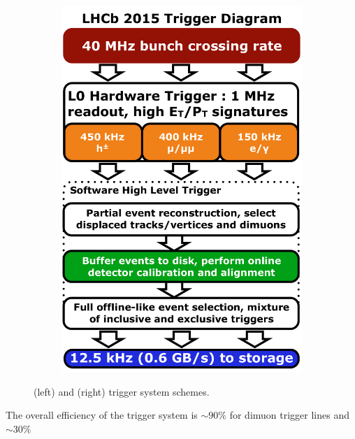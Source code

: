 \begin{figure}[t]
\begin{subfigure}{0.5\textwidth}
    \includegraphics[width=\textwidth]{Figures/Chapter2/LHCb_Trigger_RunII_May2015}
    \caption{}
    \label{det_run_two_trigger}
  \end{subfigure}
  \caption{ \runone (left) and \runtwo (right) trigger system schemes.}
  \label{det_trigger_scheams}
\end{figure}

The overall efficiency of the \lhcb trigger system is $\sim 90\%$ for dimuon trigger lines and $\sim 30\%$

